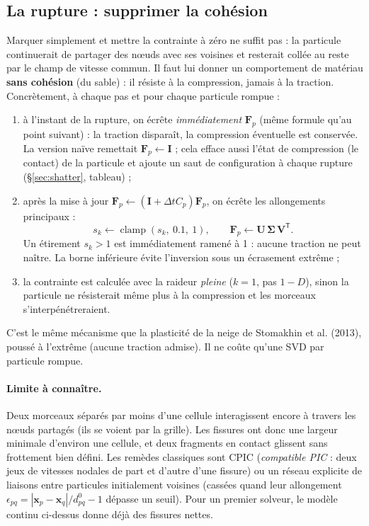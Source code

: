 \documentclass[11pt,a4paper]{article}
\newcommand{\code}[1]{\texttt{\detokenize{#1}}}
\newcommand{\bm}[1]{\boldsymbol{#1}}
\begin{document}
\subsection{La rupture : supprimer la cohésion}
\label{sec:rupture}

Marquer simplement \code{broken = 1} et mettre la contrainte à zéro ne suffit pas : la particule
continuerait de partager des n\oe uds avec ses voisines et resterait \og collée \fg{} au reste
par le champ de vitesse commun. Il faut lui donner un comportement de matériau \textbf{sans
cohésion} (du sable) : il résiste à la compression, jamais à la traction. Concrètement, à chaque
pas et pour chaque particule rompue :
\begin{enumerate}
  \item à l'instant de la rupture, on écrête \emph{immédiatement} $\mathbf F_p$ (même formule qu'au
        point suivant) : la traction disparaît, la compression éventuelle est conservée. La version
        naïve remettait $\mathbf F_p \leftarrow \mathbf I$ ; cela efface aussi l'état de compression
        (le contact) de la particule et ajoute un saut de configuration à chaque rupture
        (\S\ref{sec:shatter}, tableau) ;
  \item après la mise à jour $\mathbf F_p \leftarrow (\mathbf I + \Delta t C_p)\mathbf F_p$, on écrête
        les allongements principaux :
        \[
          s_k \leftarrow \operatorname{clamp}(s_k,\ 0.1,\ 1),\qquad \mathbf F_p \leftarrow \mathbf U\,\bm\Sigma\,\mathbf V^{\mathsf T}.
        \]
        Un étirement $s_k > 1$ est immédiatement ramené à 1 : aucune traction ne peut naître.
        La borne inférieure évite l'inversion sous un écrasement extrême ;
  \item la contrainte est calculée avec la raideur \emph{pleine} ($k = 1$, pas $1-D$), sinon la
        particule ne résisterait même plus à la compression et les morceaux s'interpénétreraient.
\end{enumerate}
C'est le même mécanisme que la plasticité de la neige de Stomakhin et al. (2013), poussé à
l'extrême (aucune traction admise). Il ne coûte qu'une SVD par particule rompue.

\paragraph{Limite à connaître.} Deux morceaux séparés par moins d'une cellule interagissent
encore à travers les n\oe uds partagés (ils \og se voient \fg{} par la grille). Les fissures ont
donc une largeur minimale d'environ une cellule, et deux fragments en contact glissent sans
frottement bien défini. Les remèdes classiques sont CPIC (\emph{compatible PIC} : deux jeux de
vitesses nodales de part et d'autre d'une fissure) ou un réseau explicite de liaisons entre
particules initialement voisines (cassées quand leur allongement
$\epsilon_{pq} = |\mathbf x_p - \mathbf x_q|/d^0_{pq} - 1$ dépasse un seuil). Pour un premier
solveur, le modèle continu ci-dessus donne déjà des fissures nettes.
\end{document}
